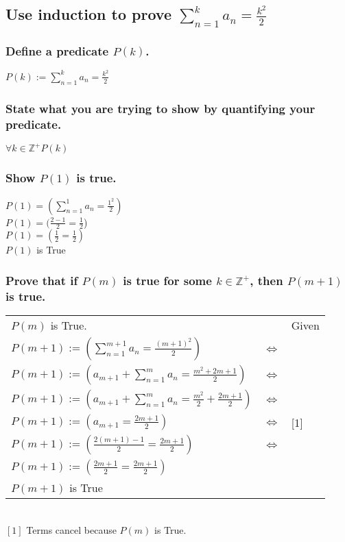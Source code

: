 \documentclass{article}
\begin{document}
\subsection{Use induction to prove $\sum_{n=1}^k a_n = \frac{k^2}{2}$}
\subsubsection{Define a predicate $P(k)$.}
\begin{center}
$P(k) := \sum_{n=1}^k a_n = \frac{k^2}{2}$
\end{center}

\subsubsection{State what you are trying to show by quantifying your predicate.}
\begin{center}
$\forall k \in \mathbb{Z}^+ P(k)$
\end{center}

\subsubsection{Show $P(1)$ is true.}
\begin{center}
$P(1) = (\sum_{n=1}^1 a_n = \frac{1^2}{2})$ \\
$P(1) = (\frac{2 - 1}{2} = \frac{1}{2}$) \\
$P(1) = (\frac{1}{2} = \frac{1}{2})$ \\
$P(1)$ is True
\end{center}

\subsubsection{Prove that if $P(m)$ is true for some $k \in \mathbb{Z}^+$, then $P(m+1)$ is true.}
\begin{center}
\begin{tabular}{lll}
$P(m)$ is True. && Given \\

$P(m+1) := (\sum_{n=1}^{m+1} a_{n} = \frac{(m+1)^2}{2})$ & $\iff$ \\
$P(m+1) := (a_{m+1} + \sum_{n=1}^{m} a_{n} = \frac{m^2 + 2m + 1}{2})$ & $\iff$ \\
$P(m+1) := (a_{m+1} + \sum_{n=1}^{m} a_{n} = \frac{m^2}{2} + \frac{2m + 1}{2})$ & $\iff$ \\
$P(m+1) := (a_{m+1} = \frac{2m+1}{2})$ & $\iff$ & [1] \\
$P(m+1) := (\frac{2(m+1) - 1}{2} = \frac{2m + 1}{2})$ & $\iff$ \\
$P(m+1) := (\frac{2m + 1}{2} = \frac{2m + 1}{2})$ \\
$P(m+1)$ is True \\
\end{tabular} \\
$[1]$ Terms cancel because $P(m)$ is True.
\end{center}
\end{document}
